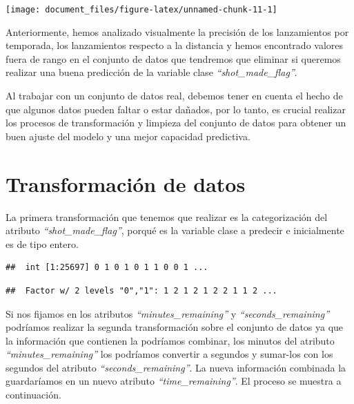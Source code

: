 \documentclass[
]{article}
\newenvironment{Shaded}{\begin{snugshade}}{\end{snugshade}}
\newcommand{\DecValTok}[1]{\textcolor[rgb]{0.00,0.00,0.81}{#1}}
\newcommand{\NormalTok}[1]{#1}
\newcommand{\OperatorTok}[1]{\textcolor[rgb]{0.81,0.36,0.00}{\textbf{#1}}}
\newcommand{\StringTok}[1]{\textcolor[rgb]{0.31,0.60,0.02}{#1}}
\begin{document}
\begin{center}\texttt{[image: document\_files/figure-latex/unnamed-chunk-11-1]} \end{center}

Anteriormente, hemos analizado visualmente la precisión de los
lanzamientos por temporada, los lanzamientos respecto a la distancia y
hemos encontrado valores fuera de rango en el conjunto de datos que
tendremos que eliminar si queremos realizar una buena predicción de la
variable clase \emph{``shot\_made\_flag''}.

Al trabajar con un conjunto de datos real, debemos tener en cuenta el
hecho de que algunos datos pueden faltar o estar dañados, por lo tanto,
es crucial realizar los procesos de transformación y limpieza del
conjunto de datos para obtener un buen ajuste del modelo y una mejor
capacidad predictiva.

\hypertarget{transformaciuxf3n-de-datos}{%
\section{\texorpdfstring{\textbf{Transformación de
datos}}{Transformación de datos}}\label{transformaciuxf3n-de-datos}}

La primera transformación que tenemos que realizar es la categorización
del atributo \emph{``shot\_made\_flag''}, porqué es la variable clase a
predecir e inicialmente es de tipo entero.

\begin{verbatim}
##  int [1:25697] 0 1 0 1 0 1 1 0 0 1 ...
\end{verbatim}

\begin{verbatim}
##  Factor w/ 2 levels "0","1": 1 2 1 2 1 2 2 1 1 2 ...
\end{verbatim}

Si nos fijamos en los atributos \emph{``minutes\_remaining''} y
\emph{``seconds\_remaining''} podríamos realizar la segunda
transformación sobre el conjunto de datos ya que la información que
contienen la podríamos combinar, los minutos del atributo
\emph{``minutes\_remaining''} los podríamos convertir a segundos y
sumar-los con los segundos del atributo \emph{``seconds\_remaining''}.
La nueva información combinada la guardaríamos en un nuevo atributo
\emph{``time\_remaining''}. El proceso se muestra a continuación.

\begin{Shaded}
\end{Shaded}
\end{document}
